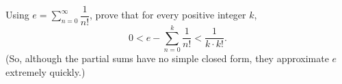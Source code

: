 Using \(e=\displaystyle\sum_{n=0}^{\infty}\dfrac{1}{n!}\), prove that for every positive integer \(k\),
\[
0<e-\sum_{n=0}^{k}\dfrac{1}{n!}<\dfrac{1}{k\cdot k!}.
\]
(So, although the partial sums have no simple closed form, they approximate \(e\) extremely quickly.)
